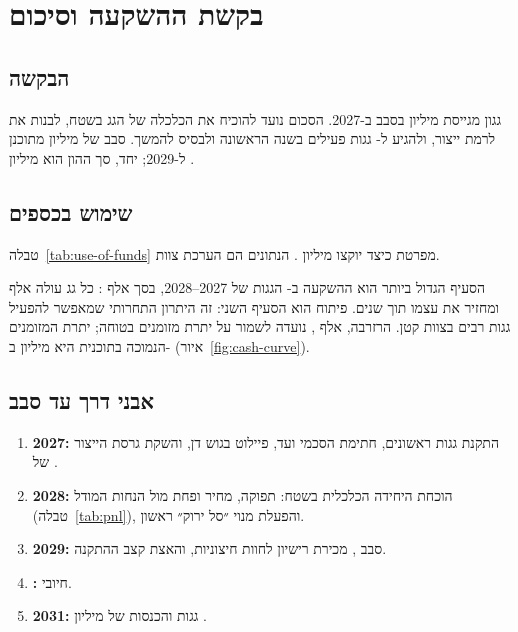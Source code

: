 \chapter{בקשת ההשקעה וסיכום}\label{ch:investment}

\section{הבקשה}
גגון מגייסת \RRseed{} מיליון \shekel{} בסבב  ב-2027. הסכום נועד להוכיח את הכלכלה של הגג בשטח, לבנות את  לרמת ייצור, ולהגיע ל-\RRroofsFirst{} גגות פעילים בשנה הראשונה ולבסיס להמשך. סבב  של \RRseriesA{} מיליון \shekel{} מתוכנן ל-2029; יחד, סך ההון הוא \RRequityTotal{} מיליון \shekel.

\section{שימוש בכספים}
טבלה~\ref{tab:use-of-funds} מפרטת כיצד יוקצו \RRseed{} מיליון \shekel. הנתונים הם הערכת צוות.

\begin{table}[htbp]
\centering\small

\caption{שימוש בכספי ה-}\label{tab:use-of-funds}
\end{table}

הסעיף הגדול ביותר הוא ההשקעה ב-\RRroofsSeed{} הגגות של 2027--2028, בסך \RRcapexSeed{} אלף \shekel: כל גג עולה \RRcapexRoof{} אלף \shekel{} ומחזיר את עצמו תוך \RRroofPayback{} שנים. פיתוח  הוא הסעיף השני: זה היתרון התחרותי שמאפשר להפעיל גגות רבים בצוות קטן. הרזרבה, \RRreserve{} אלף \shekel, נועדה לשמור על יתרת מזומנים בטוחה; יתרת המזומנים הנמוכה בתוכנית היא \RRminCash{} מיליון \shekel{} ב-\RRminCashYear{} (איור~\ref{fig:cash-curve}).

\section{אבני דרך עד סבב }
\begin{enumerate}
  \item \textbf{2027:} התקנת \RRroofsFirst{} גגות ראשונים, חתימת הסכמי ועד, פיילוט בגוש דן, והשקת גרסת הייצור של .
  \item \textbf{2028:} הוכחת היחידה הכלכלית בשטח: תפוקה, מחיר ופחת מול הנחות המודל (טבלה~\ref{tab:pnl}), והפעלת מנוי ״סל ירוק״ ראשון.
  \item \textbf{2029:} סבב , מכירת רישיון  לחוות חיצוניות, והאצת קצב ההתקנה.
  \item \textbf{\RRbreakEvenYear:}  חיובי.
  \item \textbf{2031:} \RRroofsFinal{} גגות והכנסות של \RRrevFinal{} מיליון \shekel.
\end{enumerate}


